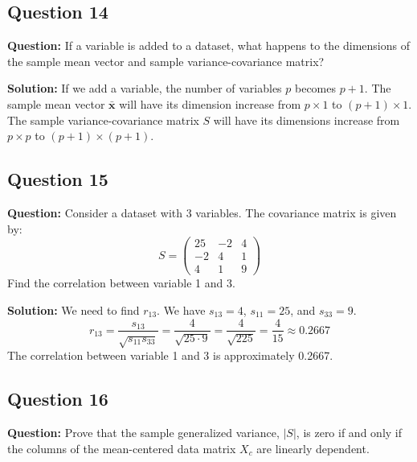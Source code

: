 \subsection*{Question 14}
\textbf{Question:} If a variable is added to a dataset, what happens to the dimensions of the sample mean vector and sample variance-covariance matrix?

\textbf{Solution:}
If we add a variable, the number of variables $p$ becomes $p+1$.
The sample mean vector $\bar{\mathbf{x}}$ will have its dimension increase from $p \times 1$ to $(p+1) \times 1$.
The sample variance-covariance matrix $S$ will have its dimensions increase from $p \times p$ to $(p+1) \times (p+1)$.

\subsection*{Question 15}
\textbf{Question:} Consider a dataset with 3 variables. The covariance matrix is given by:
$$ S = \begin{pmatrix} 25 & -2 & 4 \\ -2 & 4 & 1 \\ 4 & 1 & 9 \end{pmatrix} $$
Find the correlation between variable 1 and 3.

\textbf{Solution:}
We need to find $r_{13}$. We have $s_{13}=4$, $s_{11}=25$, and $s_{33}=9$.
$$ r_{13} = \frac{s_{13}}{\sqrt{s_{11}s_{33}}} = \frac{4}{\sqrt{25 \cdot 9}} = \frac{4}{\sqrt{225}} = \frac{4}{15} \approx 0.2667 $$
The correlation between variable 1 and 3 is approximately 0.2667.

\subsection*{Question 16}
\textbf{Question:} Prove that the sample generalized variance, $|S|$, is zero if and only if the columns of the mean-centered data matrix $X_c$ are linearly dependent.

